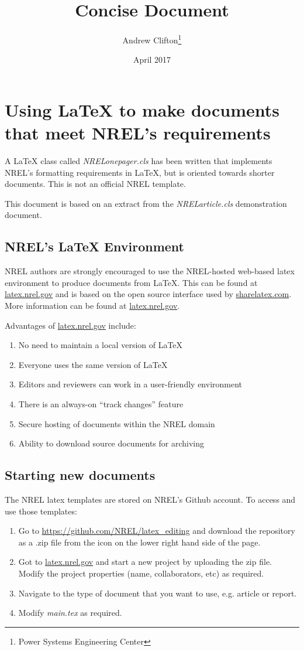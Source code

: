 \documentclass[draft]{NRELonepager}
\title{Concise Document}
\author{Andrew Clifton\thanks{Power Systems Engineering Center}}
\date{April 2017}
\begin{document}
\maketitle

\section{Using LaTeX to make documents that meet NREL's requirements}

A LaTeX class called \emph{NRELonepager.cls} has been written that implements NREL's formatting requirements in LaTeX, but is oriented towards shorter documents. This is not an official NREL template.

This document is based on an extract from the \emph{NRELarticle.cls} demonstration document.

\subsection{NREL's LaTeX Environment}
NREL authors are strongly encouraged to use the NREL-hosted web-based latex environment to produce documents from LaTeX. This can be found at \href{latex.nrel.gov}{latex.nrel.gov} and is based on the open source interface used by \href{sharelatex.com}{sharelatex.com}. More information can be found at \href{latex.nrel.gov}{latex.nrel.gov}.

Advantages of \href{latex.nrel.gov}{latex.nrel.gov} include:
\begin{enumerate}
\item No need to maintain a local version of LaTeX
\item Everyone uses the same version of LaTeX
\item Editors and reviewers can work in a user-friendly environment
\item There is an always-on ``track changes'' feature
\item Secure hosting of documents within the NREL domain
\item Ability to download source documents for archiving
\end{enumerate}

\subsection{Starting new documents}
The NREL latex templates are stored on NREL's Github account. To access and use those templates:
\begin{enumerate}
\item Go to \href{https://github.com/NREL/latex_editing}{https://github.com/NREL/latex\_editing} and download the repository as a .zip file from the icon on the lower right hand side of the page.
\item Got to \href{latex.nrel.gov}{latex.nrel.gov} and start a new project by uploading the zip file. Modify the project properties (name, collaborators, etc) as required.
\item Navigate to the type of document that you want to use, e.g. article or report.
\item Modify \emph{main.tex} as required.
\end{enumerate}
\end{document}
